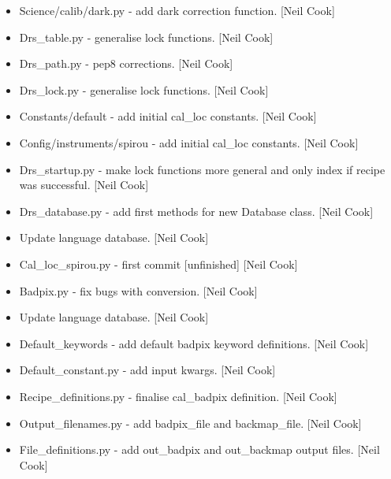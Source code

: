 \documentclass[a4paper,10pt,english]{report}
\begin{document}
\begin{itemize}
\item {} 
Science/calib/dark.py - add dark correction function. {[}Neil Cook{]}

\item {} 
Drs\_table.py - generalise lock functions. {[}Neil Cook{]}

\item {} 
Drs\_path.py - pep8 corrections. {[}Neil Cook{]}

\item {} 
Drs\_lock.py - generalise lock functions. {[}Neil Cook{]}

\item {} 
Constants/default - add initial cal\_loc constants. {[}Neil Cook{]}

\item {} 
Config/instruments/spirou - add initial cal\_loc constants. {[}Neil Cook{]}

\item {} 
Drs\_startup.py - make lock functions more general and only index if
recipe was successful. {[}Neil Cook{]}

\item {} 
Drs\_database.py - add first methods for new Database class. {[}Neil
Cook{]}

\item {} 
Update language database. {[}Neil Cook{]}

\item {} 
Cal\_loc\_spirou.py - first commit {[}unfinished{]} {[}Neil Cook{]}

\item {} 
Badpix.py - fix bugs with conversion. {[}Neil Cook{]}

\item {} 
Update language database. {[}Neil Cook{]}

\item {} 
Default\_keywords - add default badpix keyword definitions. {[}Neil Cook{]}

\item {} 
Default\_constant.py - add input kwargs. {[}Neil Cook{]}

\item {} 
Recipe\_definitions.py - finalise cal\_badpix definition. {[}Neil Cook{]}

\item {} 
Output\_filenames.py - add badpix\_file and backmap\_file. {[}Neil Cook{]}

\item {} 
File\_definitions.py - add out\_badpix and out\_backmap output files.
{[}Neil Cook{]}


\end{itemize}
\end{document}
